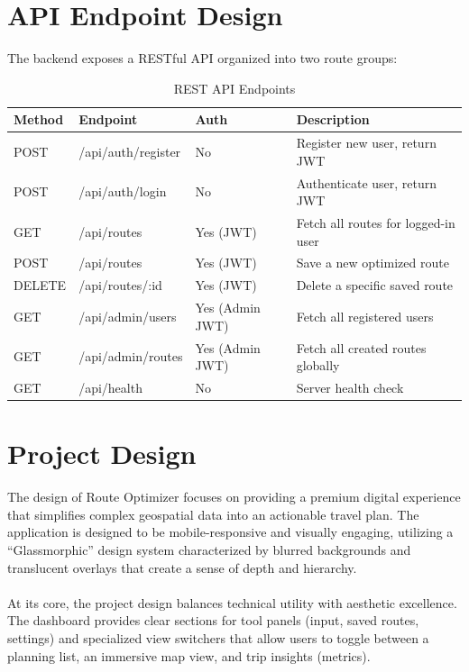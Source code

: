 \section{API Endpoint Design}
The backend exposes a RESTful API organized into two route groups:

\begin{table}[H]
    \centering
    \renewcommand{\arraystretch}{1.4}
    \small
    \begin{tabular}{|p{2cm}|p{3.5cm}|p{2cm}|p{5.5cm}|}
        \hline
        \textbf{Method} & \textbf{Endpoint} & \textbf{Auth} & \textbf{Description} \\
        \hline
        POST & /api/auth/register & No & Register new user, return JWT \\
        \hline
        POST & /api/auth/login & No & Authenticate user, return JWT \\
        \hline
        GET & /api/routes & Yes (JWT) & Fetch all routes for logged-in user \\
        \hline
        POST & /api/routes & Yes (JWT) & Save a new optimized route \\
        \hline
        DELETE & /api/routes/:id & Yes (JWT) & Delete a specific saved route \\
        \hline
        GET & /api/admin/users & Yes (Admin JWT) & Fetch all registered users \\
        \hline
        GET & /api/admin/routes & Yes (Admin JWT) & Fetch all created routes globally \\
        \hline
        GET & /api/health & No & Server health check \\
        \hline
    \end{tabular}
    \caption{REST API Endpoints}
    \label{tab:api_endpoints}
\end{table}

\section{Project Design}
The design of Route Optimizer focuses on providing a premium digital experience that simplifies complex geospatial data into an actionable travel plan. The application is designed to be mobile-responsive and visually engaging, utilizing a ``Glassmorphic'' design system characterized by blurred backgrounds and translucent overlays that create a sense of depth and hierarchy.\\\\
At its core, the project design balances technical utility with aesthetic excellence. The dashboard provides clear sections for tool panels (input, saved routes, settings) and specialized view switchers that allow users to toggle between a planning list, an immersive map view, and trip insights (metrics).

